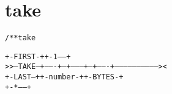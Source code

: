 \section{take}
\begin{shaded}
\begin{alltt}
/** take


             +-FIRST-+  +-1------+
   >>--TAKE--+-------+--+--------+--+-------+-----------------------------><
             +-LAST--+  +-number-+  +-BYTES-+
                        +-*------+

\end{alltt}
\end{shaded}
